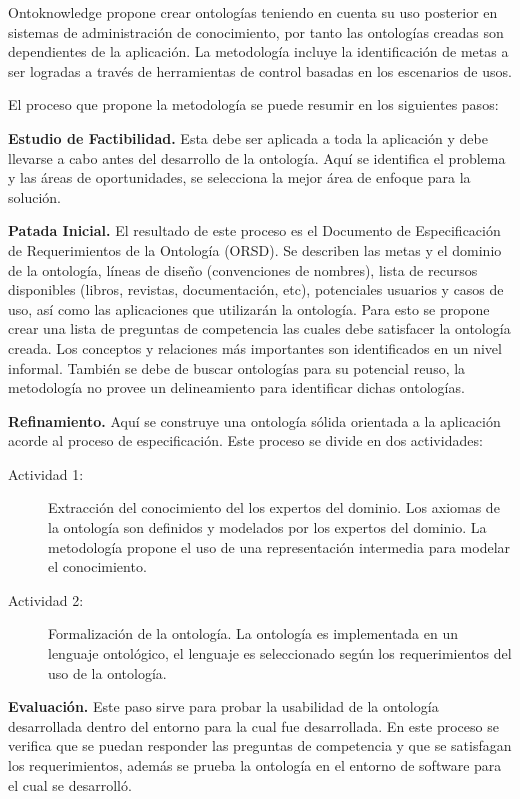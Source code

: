 Ontoknowledge propone crear ontologías teniendo en cuenta su uso posterior en sistemas de administración de conocimiento, por tanto las ontologías creadas son dependientes de la aplicación. La metodología incluye la identificación de metas a ser logradas a través de herramientas de control basadas en los escenarios de usos.

El proceso que propone la metodología se puede resumir en los siguientes pasos:

\textbf{Estudio de Factibilidad.} Esta debe ser aplicada a toda la aplicación y debe llevarse a cabo antes del desarrollo de la ontología. Aquí se identifica el problema y las áreas de oportunidades, se selecciona la mejor área de enfoque para la solución.

\textbf{Patada Inicial.} El resultado de este proceso es el Documento de Especificación de Requerimientos de la Ontología (ORSD). Se describen las metas y el dominio de la ontología, líneas de diseño (convenciones de nombres), lista de recursos disponibles (libros, revistas, documentación, etc), potenciales usuarios y casos de uso, así como las aplicaciones que utilizarán la ontología. Para esto se propone crear una lista de preguntas de competencia las cuales debe satisfacer la ontología creada. Los conceptos y relaciones más importantes son identificados en un nivel informal. También se debe de buscar ontologías para su potencial reuso, la metodología no provee un delineamiento para identificar dichas ontologías.

\textbf{Refinamiento.} Aquí se construye una ontología sólida orientada a la aplicación acorde al proceso de especificación. Este proceso se divide en dos actividades:

\begin{description}
\item[Actividad 1:] Extracción del conocimiento del los expertos del dominio. Los axiomas de la ontología son definidos y modelados por los expertos del dominio. La metodología propone el uso de una representación intermedia para modelar el conocimiento.
\item[Actividad 2:] Formalización de la ontología. La ontología es implementada en un lenguaje ontológico, el lenguaje es seleccionado según los requerimientos del uso de la ontología.
\end{description}

\textbf{Evaluación.} Este paso sirve para probar la usabilidad de la ontología desarrollada dentro del entorno para la cual fue desarrollada. En este proceso se verifica que se puedan responder las preguntas de competencia y que se satisfagan los requerimientos, además se prueba la ontología en el entorno de software para el cual se desarrolló.

